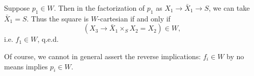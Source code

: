 Suppose $p_1\in W$. Then in the factorization of $p_1$ as $X_1\longrightarrow\bar{X}_1\longrightarrow S$, we can take $\bar{X}_1=S$. Thus the square is $W$-cartesian if and only if
\[
(X_3\longrightarrow\bar{X}_1\times_S X_2=X_2)\in W,
\]
i.e. $f_1\in W$, q.e.d.

Of course, we cannot in general assert the reverse implications: $f_i\in W$ by no means implies $p_i\in W$.